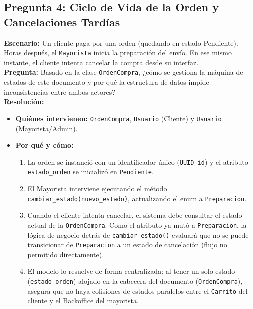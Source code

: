 \documentclass[12pt,a4paper]{report}
\begin{document}
\subsection*{Pregunta 4: Ciclo de Vida de la Orden y Cancelaciones Tardías}
\textbf{Escenario:} Un cliente paga por una orden (quedando en estado Pendiente). Horas después, el \texttt{Mayorista} inicia la preparación del envío. En ese mismo instante, el cliente intenta cancelar la compra desde su interfaz.\\
\textbf{Pregunta:} Basado en la clase \texttt{OrdenCompra}, ¿cómo se gestiona la máquina de estados de este documento y por qué la estructura de datos impide inconsistencias entre ambos actores?\\
\textbf{Resolución:}
\begin{itemize}
    \item \textbf{Quiénes intervienen:} \texttt{OrdenCompra}, \texttt{Usuario} (Cliente) y \texttt{Usuario} (Mayorista/Admin).
    \item \textbf{Por qué y cómo:}
    \begin{enumerate}
        \item La orden se instanció con un identificador único (\texttt{UUID id}) y el atributo \texttt{estado\_orden} se inicializó en \texttt{Pendiente}.
        \item El Mayorista interviene ejecutando el método \texttt{cambiar\_estado(nuevo\_estado)}, actualizando el enum a \texttt{Preparacion}.
        \item Cuando el cliente intenta cancelar, el sistema debe consultar el estado actual de la \texttt{OrdenCompra}. Como el atributo ya mutó a \texttt{Preparacion}, la lógica de negocio detrás de \texttt{cambiar\_estado()} evaluará que no se puede transicionar de \texttt{Preparacion} a un estado de cancelación (flujo no permitido directamente).
        \item El modelo lo resuelve de forma centralizada: al tener un solo estado (\texttt{estado\_orden}) alojado en la cabecera del documento (\texttt{OrdenCompra}), asegura que no haya colisiones de estados paralelos entre el \texttt{Carrito} del cliente y el Backoffice del mayorista.
    \end{enumerate}
\end{itemize}
\end{document}
